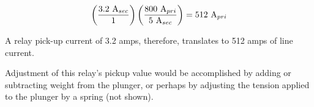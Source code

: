 $$\left({3.2 \hbox{ A}_{sec} \over 1}\right) \left({800 \hbox{ A}_{pri} \over 5 \hbox{ A}_{sec}}\right) = 512 \hbox{ A}_{pri}$$

A relay pick-up current of 3.2 amps, therefore, translates to 512 amps of line current.


\vskip 10pt

Adjustment of this relay's pickup value would be accomplished by adding or subtracting weight from the plunger, or perhaps by adjusting the tension applied to the plunger by a spring (not shown).




